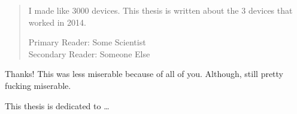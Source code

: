 
\begin{frontmatter}

\maketitle

\begin{abstract}

I made like 3000 devices. This thesis is written about the 3 devices that worked in 2014.

\vspace{1cm}

\noindent Primary Reader: Some Scientist\\
Secondary Reader: Someone Else

\end{abstract}

\begin{acknowledgment}

Thanks! This was less miserable because of all of you. Although, still pretty fucking miserable.

\end{acknowledgment}

\begin{dedication}
 
This thesis is dedicated to \ldots

\end{dedication}

\tableofcontents

\listoftables

\listoffigures

\end{frontmatter}
